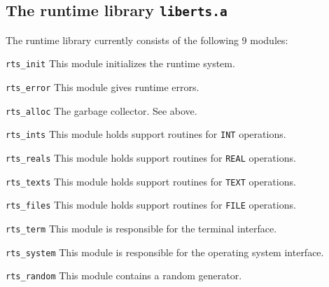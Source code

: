 \documentclass [a4paper,12pt,fleqn]{article}
\begin{document}
\subsection {The runtime library {\tt liberts.a}}
The runtime library currently consists of the following 9 modules:
\begin{list}{-}{}
\item [{\tt rts\_init}] This module initializes the runtime system.
\item [{\tt rts\_error}] This module gives runtime errors.
\item [{\tt rts\_alloc}] The garbage collector. See above.
\item [{\tt rts\_ints}]
This module holds support routines for {\tt INT} operations.
\item [{\tt rts\_reals}]
This module holds support routines for {\tt REAL} operations.
\item [{\tt rts\_texts}]
This module holds support routines for {\tt TEXT} operations.
\item [{\tt rts\_files}]
This module holds support routines for {\tt FILE} operations.
\item [{\tt rts\_term}]
This module is responsible for the terminal interface.
\item [{\tt rts\_system}]
This module is responsible for the operating system interface.
\item [{\tt rts\_random}]
This module contains a random generator.
\end{list}
\end{document}
